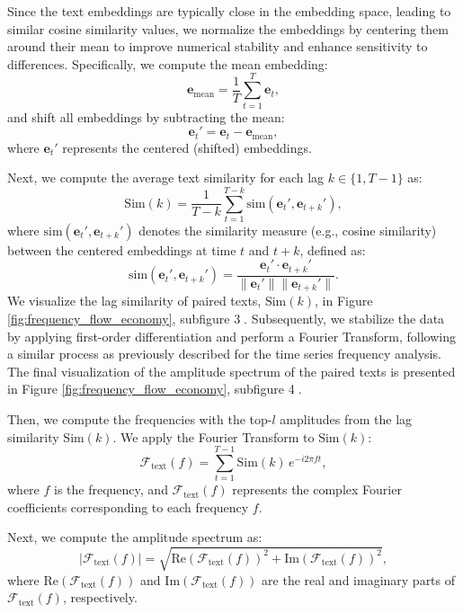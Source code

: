 Since the text embeddings are typically close in the embedding space, leading to similar cosine similarity values, we normalize the embeddings by centering them around their mean to improve numerical stability and enhance sensitivity to differences. Specifically, we compute the mean embedding:
\begin{equation}
\bm{e}_{\text{mean}} = \frac{1}{T} \sum_{t=1}^T \bm{e}_t,
\end{equation}
and shift all embeddings by subtracting the mean:
\begin{equation}
\bm{e}_t' = \bm{e}_t - \bm{e}_{\text{mean}},
\end{equation}
where $\bm{e}_t'$ represents the centered (shifted) embeddings.

Next, we compute the average text similarity for each lag $k \in \{1, T-1\}$ as:
\begin{equation}
\text{Sim}(k) = \frac{1}{T-k} \sum_{t=1}^{T-k} \text{sim}(\bm{e}_t', \bm{e}_{t+k}'),
\end{equation}
where $\text{sim}(\bm{e}_t', \bm{e}_{t+k}')$ denotes the similarity measure (e.g., cosine similarity) between the centered embeddings at time $t$ and $t+k$, defined as:
\begin{equation}
\text{sim}(\bm{e}_t', \bm{e}_{t+k}') = \frac{\bm{e}_t' \cdot \bm{e}_{t+k}'}{\|\bm{e}_t'\| \|\bm{e}_{t+k}'\|}.
\end{equation}
We visualize the lag similarity of paired texts, $\text{Sim}(k)$, in Figure \ref{fig:frequency_flow_economy}, subfigure \textcircled{3}. Subsequently, we stabilize the data by applying first-order differentiation and perform a Fourier Transform, following a similar process as previously described for the time series frequency analysis. The final visualization of the amplitude spectrum of the paired texts is presented in Figure \ref{fig:frequency_flow_economy}, subfigure \textcircled{4}.

Then, we compute the frequencies with the top-$l$ amplitudes from the lag similarity $\text{Sim}(k)$. We apply the Fourier Transform to $\text{Sim}(k)$:
\begin{equation}
\mathcal{F}_{\text{text}}(f) = \sum_{t=1}^{T-1} \text{Sim}(k) \, e^{-i 2 \pi f t},
\end{equation}
where $f$ is the frequency, and $\mathcal{F}_{\text{text}}(f)$ represents the complex Fourier coefficients corresponding to each frequency $f$.

Next, we compute the amplitude spectrum as:
\begin{equation}
|\mathcal{F}_{\text{text}}(f)| = \sqrt{\text{Re}(\mathcal{F}_{\text{text}}(f))^2 + \text{Im}(\mathcal{F}_{\text{text}}(f))^2},
\end{equation}
where $\text{Re}(\mathcal{F}_{\text{text}}(f))$ and $\text{Im}(\mathcal{F}_{\text{text}}(f))$ are the real and imaginary parts of $\mathcal{F}_{\text{text}}(f)$, respectively.

